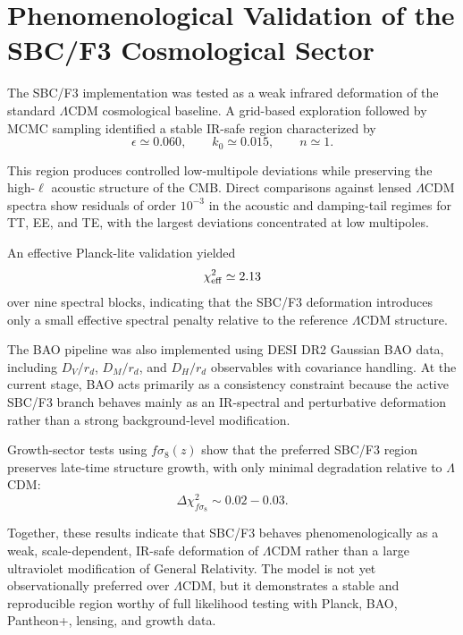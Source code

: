 
\section{Phenomenological Validation of the SBC/F3 Cosmological Sector}

The SBC/F3 implementation was tested as a weak infrared deformation of the standard
\(\Lambda\)CDM cosmological baseline. A grid-based exploration followed by MCMC
sampling identified a stable IR-safe region characterized by
\[
\epsilon \simeq 0.060,\qquad k_0 \simeq 0.015,\qquad n \simeq 1.
\]

This region produces controlled low-multipole deviations while preserving the
high-\(\ell\) acoustic structure of the CMB. Direct comparisons against lensed
\(\Lambda\)CDM spectra show residuals of order \(10^{-3}\) in the acoustic and
damping-tail regimes for TT, EE, and TE, with the largest deviations concentrated
at low multipoles.

An effective Planck-lite validation yielded
\[
\chi^2_{\rm eff} \simeq 2.13
\]
over nine spectral blocks, indicating that the SBC/F3 deformation introduces only
a small effective spectral penalty relative to the reference \(\Lambda\)CDM
structure.

The BAO pipeline was also implemented using DESI DR2 Gaussian BAO data, including
\(D_V/r_d\), \(D_M/r_d\), and \(D_H/r_d\) observables with covariance handling.
At the current stage, BAO acts primarily as a consistency constraint because the
active SBC/F3 branch behaves mainly as an IR-spectral and perturbative deformation
rather than a strong background-level modification.

Growth-sector tests using \(f\sigma_8(z)\) show that the preferred SBC/F3 region
preserves late-time structure growth, with only minimal degradation relative to
\(\Lambda\)CDM:
\[
\Delta \chi^2_{f\sigma_8} \sim 0.02-0.03.
\]

Together, these results indicate that SBC/F3 behaves phenomenologically as a weak,
scale-dependent, IR-safe deformation of \(\Lambda\)CDM rather than a large ultraviolet
modification of General Relativity. The model is not yet observationally preferred
over \(\Lambda\)CDM, but it demonstrates a stable and reproducible region worthy of
full likelihood testing with Planck, BAO, Pantheon+, lensing, and growth data.
